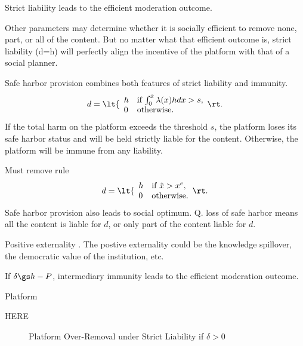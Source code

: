 \begin{proposition}
Strict liability leads to the efficient moderation outcome.
\end{proposition}

Other parameters may determine whether it is socially efficient to remove none, part, or all of the content. But no matter what that efficient outcome is, strict liability (d=h) will perfectly align the incentive of the platform with that of a social planner.

Safe harbor provision combines both features of strict liability and immunity. 
\begin{equation}
d=
\lt\{\begin{array}{ll}
    h & \mbox{if $\int_0^{\hat{x}}\lambda(x)hdx>s$}, \\
    0 & \mbox{otherwise}.
\end{array}\rt.
\end{equation}
If the total harm on the platform exceeds the threshold $s$, the platform loses its safe harbor status and will be held strictly liable for the content. Otherwise, the platform will be immune from any liability. 

Must remove rule
\begin{equation}
d=
\lt\{\begin{array}{ll}
    h & \mbox{if $\hat{x}>x^e$}, \\
    0 & \mbox{otherwise}.
\end{array}\rt.
\end{equation}
Safe harbor provision also leads to social optimum. Q. loss of safe harbor means all the content is liable for $d$, or only part of the content liable for $d$.

Positive externality . The postive externality could be the knowledge spillover, the democratic value of the institution, etc.

\begin{proposition}
If $\delta\gs h-P$, intermediary immunity leads to the efficient moderation outcome.    
\end{proposition}


Platform 




HERE






\begin{figure}[h]
    \centering
{}
    \caption{Platform Over-Removal under Strict Liability if $\delta>0$}
    \label{fig:removal}
\end{figure}



